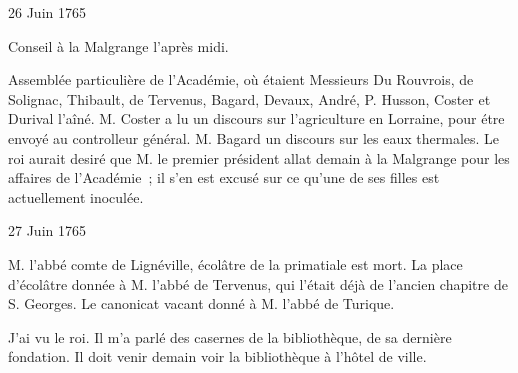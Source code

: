                      \begin{diary}{26 Juin 1765}{}
                        
                         Conseil à la Malgrange l'après midi. \bigskip
        
        
                         Assemblée particulière de l'Académie, où étaient
                           Messieurs
                           Du Rouvrois, de Solignac, Thibault, de
                           Tervenus,
                           Bagard, Devaux,
                              André, P.
                              Husson, Coster et Durival l'aîné. M.
                              Coster a lu un discours
                              sur l'agriculture en Lorraine, pour étre envoyé
                           au controlleur
                              général. M. Bagard
                           un discours
                              sur les eaux thermales. Le roi aurait desiré
                           que M. le premier président allat demain à la Malgrange
                           pour les affaires de l'Académie ; il s'en est excusé
                           sur ce qu'une de ses filles est actuellement inoculée. \bigskip
        
        
                     \end{diary}

                     \begin{diary}{27 Juin 1765}{}
                        
                        
                           M. l'abbé
                            comte de Lignéville,
                           écolâtre de la
                              primatiale est
                              mort. La place
                           d'écolâtre donnée à M. l'abbé de
                              Tervenus, qui
                           l'était déjà de l'ancien chapitre
                              de S. Georges.
                           Le canonicat vacant donné
                           à M. l'abbé de
                              Turique. \bigskip
        
        
                         J'ai vu le roi. Il m'a parlé des casernes
                           de la bibliothèque, de sa dernière fondation. Il
                           doit venir demain voir la bibliothèque à
                              l'hôtel de ville. \bigskip
        
        
                     \end{diary}

